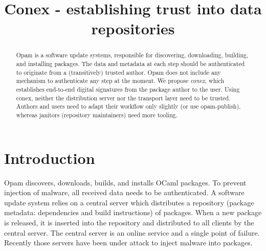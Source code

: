 \documentclass[nocopyrightspace]{sigplanconf}
\begin{document}
\setlength{\pdfpageheight}{\paperheight}
\setlength{\pdfpagewidth}{\paperwidth}

\title{Conex - establishing trust into data repositories}


\date{}

\maketitle

\begin{abstract}
  Opam is a software update systems, responsible for discovering, downloading, building, and installing packages.
  The data and metadata at each step should be authenticated to originate from a (transitively) trusted author.
  Opam does not include any mechanism to authenticate any step at the moment.
  We propose \emph{conex}, which establishes end-to-end digital signatures from the package author to the user.
  Using conex, neither the distribution server nor the transport layer need to be trusted.
  Authors and users need to adapt their workflow only slightly (or use opam-publish), whereas janitors (repository maintainers) need more tooling.
\end{abstract}

\section{Introduction}
Opam discovers, downloads, builds, and installs OCaml packages.
To prevent injection of malware, all received data needs to be authenticated.
A software update system relies on a central server which distributes a repository (package metadata: dependencies and build instructions) of packages.
When a new package is released, it is inserted into the repository and distributed to all clients by the central server.
The central server is an online service and a single point of failure.
Recently those servers have been under attack \cite{adobe,apache2,apache1,opera,kernel,cabal,kernelorg,debian,freebsd,php3,savannah,maven,savannah2,npm,php,phpmyadmin,php2,github,ocamlforge,redhatssh,gentoo,rubygems,fedora,wordpress} to inject malware into packages.
\end{document}
